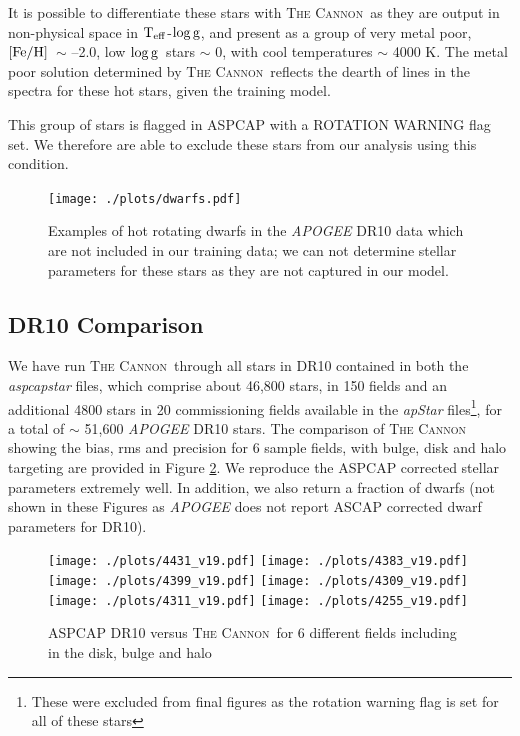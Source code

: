 \documentclass[12pt, preprint]{aastex}
\newcommand{\teff}{\mbox{$\rm T_{eff}$}}
\newcommand{\feh}{\mbox{$\rm [Fe/H]$}}
\newcommand{\logg}{\mbox{$\rm \log g$}}
\newcommand{\tc}{\textsc{The Cannon}}
\begin{document}
It is possible to differentiate these stars with \tc\, as they are output in non-physical space in \teff-\logg, and present as a group of very metal poor, \feh\ $\sim$ --2.0, low \logg\ stars $\sim$ 0, with cool temperatures $\sim$ 4000 K. The metal poor solution determined by \tc\ reflects the dearth of lines in the spectra for these hot stars, given the training model. 

This group of stars is flagged in ASPCAP with a ROTATION WARNING flag set. We therefore are able to exclude these stars from our analysis using this condition. 
 
 \begin{figure}[h]
 \texttt{[image: ./plots/dwarfs.pdf]}
  \caption{Examples of hot rotating dwarfs in the \textit{APOGEE} DR10 data which are not included in our training data; we can not determine stellar parameters for these stars as they are not captured in our model.}
\label{fig:dwarfs}
\end{figure}

\subsection{DR10 Comparison}
 
We have run \tc\ through all stars in DR10 contained in both the \textit{aspcapstar} files,  which comprise about 46,800 stars, in 150 fields and an additional 4800 stars in 20 commissioning fields available in the \textit{apStar} files\footnote{These were excluded from final figures as the rotation warning flag is set for all of these stars}, for a total of $\sim$ 51,600 \textit{APOGEE} DR10 stars. The comparison of \tc\, showing the bias, rms and precision for 6 sample fields, with bulge, disk and halo targeting are provided in Figure \ref{fig:cal}. We reproduce the ASPCAP corrected stellar parameters extremely well. In addition, we also return a fraction of dwarfs (not shown in these Figures as \textit{APOGEE} does not report ASCAP corrected dwarf parameters for DR10). 

\begin{figure}[h!]
\centering
  \texttt{[image: ./plots/4431\_v19.pdf]}
    \texttt{[image: ./plots/4383\_v19.pdf]} \\
      \texttt{[image: ./plots/4399\_v19.pdf]}
        \texttt{[image: ./plots/4309\_v19.pdf]} \\
              \texttt{[image: ./plots/4311\_v19.pdf]}
        \texttt{[image: ./plots/4255\_v19.pdf]} \\
\caption{\small{ASPCAP DR10 versus \tc\ for 6 different fields including in the disk, bulge and halo}}
\label{fig:cal}
\end{figure}
\end{document}
